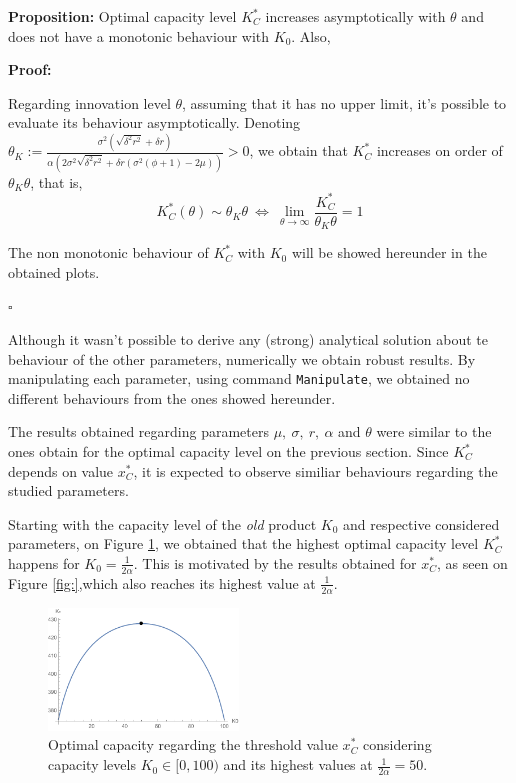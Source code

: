 \textbf{Proposition:}
Optimal capacity level $K^*_C$ increases asymptotically with $\theta$ and does not have a monotonic behaviour with $K_0$. Also, 

\textbf{Proof:}

Regarding innovation level $\theta$, assuming that it has no upper limit, it's possible to evaluate its behaviour asymptotically. Denoting $\theta_K:=\frac{\sigma ^2 \left(\sqrt{\delta ^2 r^2}+\delta  r\right)}{\alpha  \left(2 \sigma ^2 \sqrt{\delta ^2 r^2}+\delta  r \left(\sigma ^2 (\phi +1)-2 \mu \right)\right)}>0$, we obtain that $K^*_C$ increases on order of $\theta_K \theta$, that is,
$$K^*_C(\theta) \sim \theta_K \theta \ \Leftrightarrow \ \lim_{\theta \to \infty}  \frac{K^*_C}{\theta_K \theta}=1 $$


The non monotonic behaviour of $K^*_C$ with $K_0$ will be showed hereunder in the obtained plots.
\begin{flushright}
	$\square$
\end{flushright}

Although it wasn't possible to derive any (strong) analytical solution about te behaviour of the other parameters, numerically we obtain robust results. By manipulating each parameter, using command \texttt{Manipulate}, we obtained no different behaviours from the ones showed hereunder.

The results obtained regarding parameters $\mu, \ \sigma,\ r, \ \alpha$ and $\theta$  were similar to the ones obtain for the optimal capacity level on the previous section.  Since $K^*_C$ depends on value $x_C^*$, it is expected to observe similiar behaviours regarding the studied parameters. 

Starting with the capacity level of the \textit{old} product $K_0$ and respective considered parameters, on Figure \ref{fig:2_k0}, we obtained that the highest optimal capacity level $K^*_C$ happens for $K_0=\frac{1}{2 \alpha}$. This is motivated by the results obtained for $x^*_C$, as seen on Figure \ref{fig:},which also reaches its highest value at $\frac{1}{2 \alpha}$.

\begin{figure}[!htb]
	\centering
	\includegraphics[width=0.45\textwidth]{Prob2_CapOpt/koptx_k0.pdf}
	\caption{Optimal capacity regarding the threshold value $x^*_C$ considering capacity levels $K_0 \in [0, 100)$ and its highest values at $\frac{1}{2 \alpha}=50$.}
	\label{fig:2_k0}
\end{figure}

